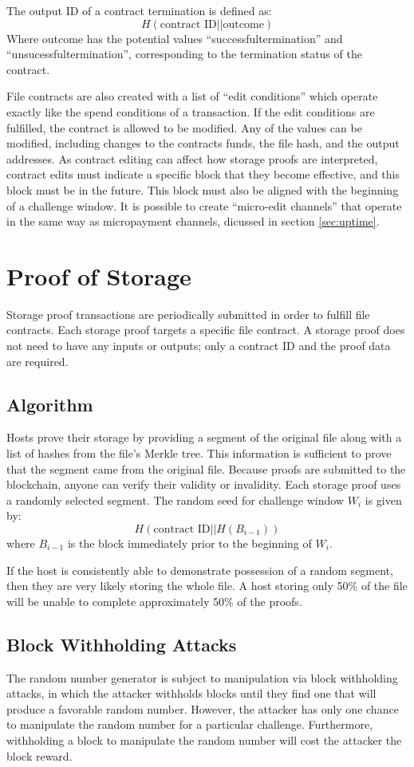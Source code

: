 \documentclass[twocolumn]{article}
\begin{document}
The output ID of a contract termination is defined as:
\[
	H(\text{contract ID} || \text{outcome})
\]
Where outcome has the potential values ``successfultermination'' and ``unsucessfultermination'', corresponding to the termination status of the contract.

File contracts are also created with a list of ``edit conditions'' which operate exactly like the spend conditions of a transaction.
If the edit conditions are fulfilled, the contract is allowed to be modified.
Any of the values can be modified, including changes to the contracts funds, the file hash, and the output addresses.
As contract editing can affect how storage proofs are interpreted, contract edits must indicate a specific block that they become effective, and this block must be in the future.
This block must also be aligned with the beginning of a challenge window.
It is possible to create ``micro-edit channels'' that operate in the same way as micropayment channels, dicussed in section \ref{sec:uptime}.

\section{Proof of Storage}
\label{sec:storage}
Storage proof transactions are periodically submitted in order to fulfill file contracts.
Each storage proof targets a specific file contract.
A storage proof does not need to have any inputs or outputs; only a contract ID and the proof data are required.

\subsection{Algorithm}
Hosts prove their storage by providing a segment of the original file along with a list of hashes from the file's Merkle tree.
This information is sufficient to prove that the segment came from the original file.
Because proofs are submitted to the blockchain, anyone can verify their validity or invalidity.
Each storage proof uses a randomly selected segment.
The random seed for challenge window $W_i$ is given by:
\[
	H(\text{contract ID} || H(B_{i-1}))
\]
where $B_{i-1}$ is the block immediately prior to the beginning of $W_i$.

If the host is consistently able to demonstrate possession of a random segment, then they are very likely storing the whole file.
A host storing only 50\% of the file will be unable to complete approximately 50\% of the proofs.

\subsection{Block Withholding Attacks}
The random number generator is subject to manipulation via block withholding attacks, in which the attacker withholds blocks until they find one that will produce a favorable random number.
However, the attacker has only one chance to manipulate the random number for a particular challenge.
Furthermore, withholding a block to manipulate the random number will cost the attacker the block reward.
\end{document}
